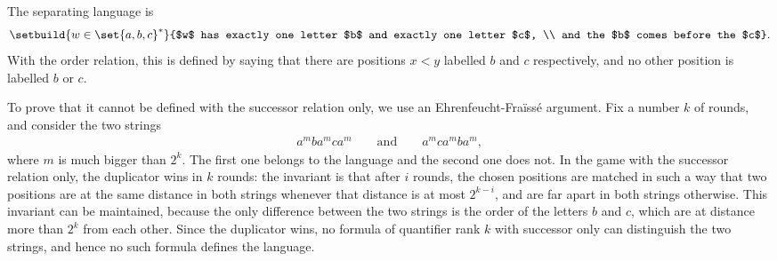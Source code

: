 {
The separating language is
\begin{align*}
\setbuild{w \in \set{a,b,c}^*}{$w$ has exactly one letter $b$ and exactly one letter $c$, \\ and the $b$ comes before the $c$}.
\end{align*}
With the order relation, this is defined by saying that there are positions $x < y$ labelled $b$ and $c$ respectively, and no other position is labelled $b$ or $c$. 

To prove that it cannot be defined with the successor relation only, we use an Ehrenfeucht-Fra\"iss\'e argument. Fix a number $k$ of rounds, and consider the two strings
\begin{align*}
a^m b a^m c a^m \qquad \text{and} \qquad a^m c a^m b a^m,
\end{align*}
where $m$ is much bigger than $2^k$. The first one belongs to the language and the second one does not. In the game with the successor relation only, the duplicator wins in $k$ rounds: the invariant is that after $i$ rounds, the chosen positions are matched in such a way that two positions are at the same distance in both strings whenever that distance is at most $2^{k-i}$, and are far apart in both strings otherwise. This invariant can be maintained, because the only difference between the two strings is the order of the letters $b$ and $c$, which are at distance more than $2^k$ from each other. Since the duplicator wins, no formula of quantifier rank $k$ with successor only can distinguish the two strings, and hence no such formula defines the language.
}
        
